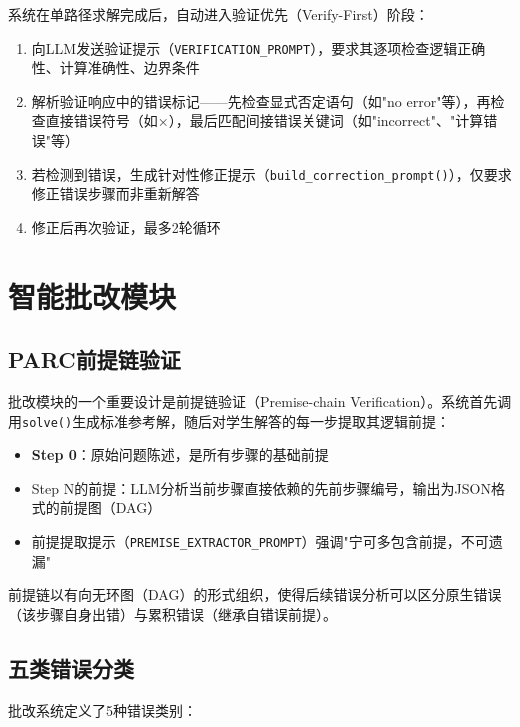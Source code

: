 \documentclass[12pt,a4paper]{ctexart}
\begin{document}
系统在单路径求解完成后，自动进入验证优先（Verify-First）阶段：

\begin{enumerate}[nosep]
  \item 向LLM发送验证提示（\verb|VERIFICATION_PROMPT|），要求其逐项检查逻辑正确性、计算准确性、边界条件
  \item 解析验证响应中的错误标记——先检查显式否定语句（如"no error"等），再检查直接错误符号（如×），最后匹配间接错误关键词（如"incorrect"、"计算错误"等）
  \item 若检测到错误，生成针对性修正提示（\verb|build_correction_prompt()|），仅要求修正错误步骤而非重新解答
  \item 修正后再次验证，最多2轮循环
\end{enumerate}

\section{智能批改模块}

\subsection{PARC前提链验证}

批改模块的一个重要设计是前提链验证（Premise-chain Verification）。系统首先调用\verb|solve()|生成标准参考解，随后对学生解答的每一步提取其逻辑前提：

\begin{itemize}[nosep]
  \item \textbf{Step 0}：原始问题陈述，是所有步骤的基础前提
  \item Step N的前提：LLM分析当前步骤直接依赖的先前步骤编号，输出为JSON格式的前提图（DAG）
  \item 前提提取提示（\verb|PREMISE_EXTRACTOR_PROMPT|）强调"宁可多包含前提，不可遗漏"
\end{itemize}

前提链以有向无环图（DAG）的形式组织，使得后续错误分析可以区分原生错误（该步骤自身出错）与累积错误（继承自错误前提）。

\subsection{五类错误分类}

批改系统定义了5种错误类别：
\end{document}
